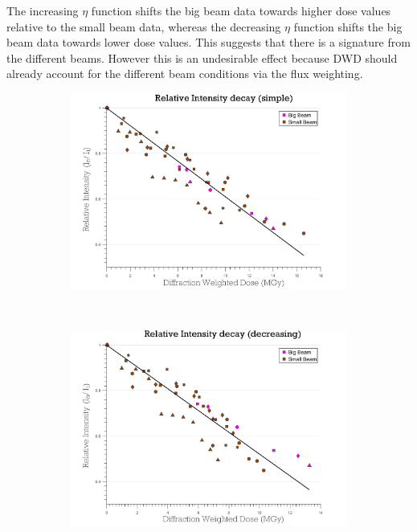 The increasing $\eta$ function shifts the big beam data towards higher dose values relative to the small beam data, whereas the decreasing $\eta$ function shifts the big beam data towards lower dose values.
This suggests that there is a signature from the different beams.
However this is an undesirable effect because DWD should already account for the different beam conditions via the flux weighting.
\begin{figure}
	\centering
    \begin{subfigure}[b]{1\textwidth}
        \centering
        \includegraphics[width=\textwidth]{figures/dwd/reproduce_relint_DWDsimple.pdf}
        \caption{}
        \label{fig:Relative intensity - Simple DWD}
    \end{subfigure}
    \\
	\begin{subfigure}[b]{1\textwidth}
        \centering
        \includegraphics[width=\textwidth]{figures/dwd/reproduce_relint_DWDwrong.pdf}
        \caption{}
        \label{fig:Relative intensity - Increasing Eta}
    \end{subfigure}
\end{figure}
